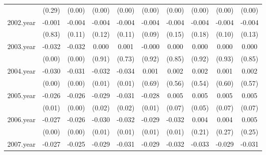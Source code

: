 {\begin{tabular}{l*{9}{c}}
          &   (0.29)         &   (0.00)         &   (0.00)         &   (0.00)         &   (0.00)         &   (0.00)         &   (0.00)         &   (0.00)         &   (0.00)         \\
[1em]
2002.year &   -0.001         &   -0.004         &   -0.004         &   -0.004         &   -0.004         &   -0.004         &   -0.004         &   -0.004         &   -0.004         \\
          &   (0.83)         &   (0.11)         &   (0.12)         &   (0.11)         &   (0.09)         &   (0.15)         &   (0.18)         &   (0.10)         &   (0.13)         \\
[1em]
2003.year &   -0.032\sym{**} &   -0.032\sym{**} &    0.000         &    0.001         &   -0.000         &    0.000         &    0.000         &    0.000         &    0.000         \\
          &   (0.00)         &   (0.00)         &   (0.91)         &   (0.73)         &   (0.92)         &   (0.85)         &   (0.92)         &   (0.93)         &   (0.85)         \\
[1em]
2004.year &   -0.030\sym{**} &   -0.031\sym{***}&   -0.032\sym{**} &   -0.034\sym{*}  &    0.001         &    0.002         &    0.002         &    0.001         &    0.002         \\
          &   (0.00)         &   (0.00)         &   (0.01)         &   (0.01)         &   (0.69)         &   (0.56)         &   (0.54)         &   (0.60)         &   (0.57)         \\
[1em]
2005.year &   -0.026\sym{**} &   -0.026\sym{**} &   -0.029\sym{*}  &   -0.031\sym{*}  &   -0.028\sym{*}  &    0.005         &    0.005\sym{*}  &    0.005         &    0.005         \\
          &   (0.01)         &   (0.00)         &   (0.02)         &   (0.02)         &   (0.01)         &   (0.07)         &   (0.05)         &   (0.07)         &   (0.07)         \\
[1em]
2006.year &   -0.027\sym{**} &   -0.026\sym{***}&   -0.030\sym{**} &   -0.032\sym{*}  &   -0.029\sym{**} &   -0.032\sym{*}  &    0.004         &    0.004         &    0.005         \\
          &   (0.00)         &   (0.00)         &   (0.01)         &   (0.01)         &   (0.01)         &   (0.01)         &   (0.21)         &   (0.27)         &   (0.25)         \\
[1em]
2007.year &   -0.027\sym{**} &   -0.025\sym{***}&   -0.029\sym{**} &   -0.031\sym{**} &   -0.029\sym{**} &   -0.032\sym{*}  &   -0.033\sym{**} &   -0.029\sym{**} &   -0.031\sym{**} \\

\end{tabular}}

